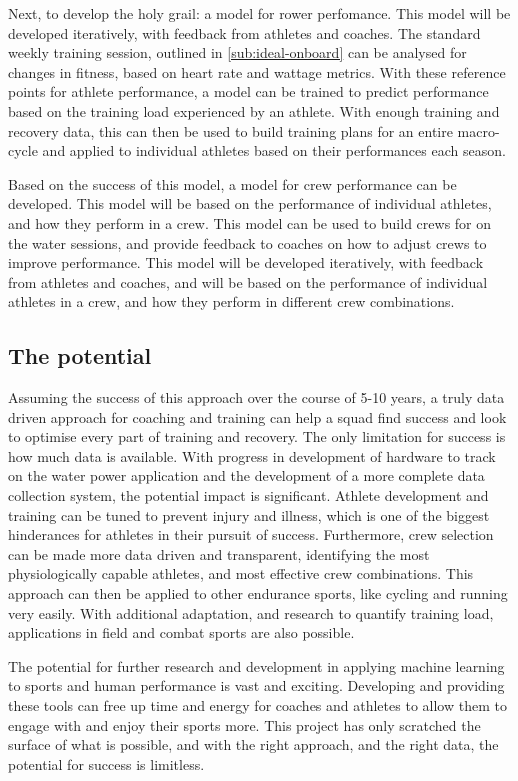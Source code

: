 Next, to develop the holy grail: a model for rower perfomance. This model will be developed iteratively, with feedback from athletes and coaches. The standard weekly training session, outlined in \autoref{sub:ideal-onboard} can be analysed for changes in fitness, based on heart rate and wattage metrics. With these reference points for athlete performance, a model can be trained to predict performance based on the training load experienced by an athlete. With enough training and recovery data, this can then be used to build training plans for an entire macro-cycle and applied to individual athletes based on their performances each season. 

Based on the success of this model, a model for crew performance can be developed. This model will be based on the performance of individual athletes, and how they perform in a crew. This model can be used to build crews for on the water sessions, and provide feedback to coaches on how to adjust crews to improve performance. This model will be developed iteratively, with feedback from athletes and coaches, and will be based on the performance of individual athletes in a crew, and how they perform in different crew combinations.

\subsection{The potential}
Assuming the success of this approach over the course of 5-10 years, a truly data driven approach for coaching and training can help a squad find success and look to optimise every part of training and recovery. The only limitation for success is how much data is available. With progress in development of hardware to track on the water power application and the development of a more complete data collection system, the potential impact is significant. Athlete development and training can be tuned to prevent injury and illness, which is one of the biggest hinderances for athletes in their pursuit of success. Furthermore, crew selection can be made more data driven and transparent, identifying the most physiologically capable athletes, and most effective crew combinations. This approach can then be applied to other endurance sports, like cycling and running very easily. With additional adaptation, and research to quantify training load, applications in field and combat sports are also possible.

The potential for further research and development in applying machine learning to sports and human performance is vast and exciting. Developing and providing these tools can free up time and energy for coaches and athletes to allow them to engage with and enjoy their sports more. This project has only scratched the surface of what is possible, and with the right approach, and the right data, the potential for success is limitless.